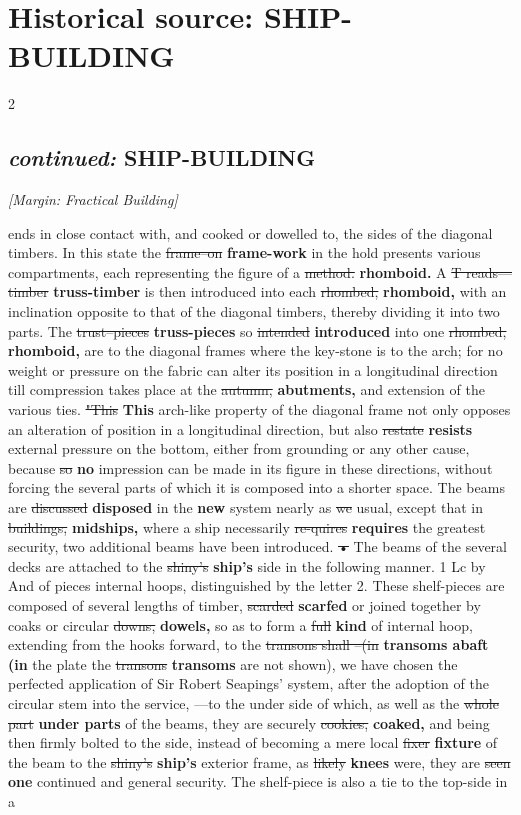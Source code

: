 \documentclass[10pt]{article}
\begin{document}
\section*{Historical source: SHIP-BUILDING}
\begin{multicols}{2}
\subsection*{\textit{continued:} SHIP-BUILDING}
{\small\itshape [Margin: Fractical Building]}\par
ends in close contact with, and cooked or dowelled to, the sides of the diagonal timbers. In this state the \sout{frame--on} \textbf{frame-work} in the hold presents various compartments, each representing the figure of a \sout{method.} \textbf{rhomboid.} A \sout{T reads—timber} \textbf{truss-timber} is then introduced into each \sout{rhombed,} \textbf{rhomboid,} with an inclination opposite to that of the diagonal timbers, thereby dividing it into two parts. The \sout{trust--pieces} \textbf{truss-pieces} so \sout{intended} \textbf{introduced} into one \sout{rhombed,} \textbf{rhomboid,} are to the diagonal frames where the key-stone is to the arch; for no weight or pressure on the fabric can alter its position in a longitudinal direction till compression takes place at the \sout{autumn,} \textbf{abutments,} and extension of the various ties. \sout{"This} \textbf{This} arch-like property of the diagonal frame not only opposes an alteration of position in a longitudinal direction, but also \sout{restate} \textbf{resists} external pressure on the bottom, either from grounding or any other cause, because \sout{so} \textbf{no} impression can be made in its figure in these directions, without forcing the several parts of which it is composed into a shorter space. The beams are \sout{discussed} \textbf{disposed} in the \textbf{new} system nearly as \sout{we} usual, except that in \sout{buildings,} \textbf{midships,} where a ship necessarily \sout{re-quires} \textbf{requires} the greatest security, two additional beams have been introduced. \sout{•} The beams of the several decks are attached to the \sout{shiny’s} \textbf{ship's} side in the following manner. 1 Lc by And of pieces internal hoops, distinguished by the letter 2. These shelf-pieces are composed of several lengths of timber, \sout{scarded} \textbf{scarfed} or joined together by coaks or circular \sout{downs,} \textbf{dowels,} so as to form a \sout{full} \textbf{kind} of internal hoop, extending from the hooks forward, to the \sout{transons shall --(in} \textbf{transoms abaft (in} the plate the \sout{transons} \textbf{transoms} are not shown), we have chosen the perfected application of Sir Robert Seapings’ system, after the adoption of the circular stem into the service, —to the under side of which, as well as the \sout{whole part} \textbf{under parts} of the beams, they are securely \sout{cookies,} \textbf{coaked,} and being then firmly bolted to the side, instead of becoming a mere local \sout{fixer} \textbf{fixture} of the beam to the \sout{shiny’s} \textbf{ship’s} exterior frame, as \sout{likely} \textbf{knees} were, they are \sout{seen} \textbf{one} continued and general security. The shelf-piece is also a tie to the top-side in a 
\end{multicols}
\end{document}
